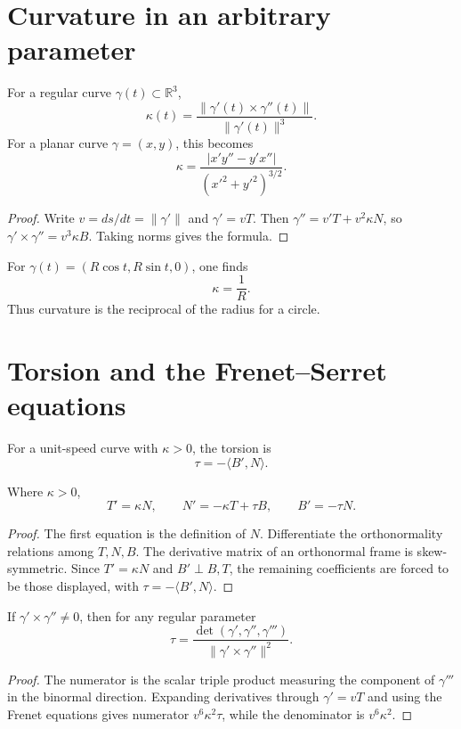 \section{Curvature in an arbitrary parameter}
\begin{theorem}\label{thm:vii13-curvature-formula}
For a regular curve \(\gamma(t)\subset\mathbb R^3\),
\[
\boxed{\kappa(t)=\frac{\|\gamma'(t)\times\gamma''(t)\|}{\|\gamma'(t)\|^3}.}
\]
For a planar curve \(\gamma=(x,y)\), this becomes
\[
\kappa=\frac{|x'y''-y'x''|}{(x'^2+y'^2)^{3/2}}.
\]
\end{theorem}
\begin{proof}
Write \(v=ds/dt=\|\gamma'\|\) and \(\gamma'=vT\).  Then \(\gamma''=v'T+v^2\kappa N\), so
\(\gamma'\times\gamma''=v^3\kappa B\).  Taking norms gives the formula.
\end{proof}

\begin{example}[Circle]\label{ex:vii13-circle}
For \(\gamma(t)=(R\cos t,R\sin t,0)\), one finds
\[
\kappa=\frac1R.
\]
Thus curvature is the reciprocal of the radius for a circle.
\end{example}

\section{Torsion and the Frenet--Serret equations}
\begin{definition}[Torsion]\label{def:vii13-torsion}
For a unit-speed curve with \(\kappa>0\), the torsion is
\[
\tau=-\langle B',N\rangle.
\]
\end{definition}

\begin{theorem}\label{thm:vii13-frenet-serret}
Where \(\kappa>0\),
\[
T'=\kappa N,\qquad
N'=-\kappa T+\tau B,\qquad
B'=-\tau N.
\]
\end{theorem}
\begin{proof}
The first equation is the definition of \(N\).  Differentiate the orthonormality relations among \(T,N,B\).  The derivative matrix of an orthonormal frame is skew-symmetric.  Since \(T'=\kappa N\) and \(B'\perp B,T\), the remaining coefficients are forced to be those displayed, with \(\tau=-\langle B',N\rangle\).
\end{proof}

\begin{theorem}\label{thm:vii13-torsion-formula}
If \(\gamma'\times\gamma''\neq0\), then for any regular parameter
\[
\boxed{\tau=
\frac{\det(\gamma',\gamma'',\gamma''')}{\|\gamma'\times\gamma''\|^2}.}
\]
\end{theorem}
\begin{proof}
The numerator is the scalar triple product measuring the component of \(\gamma'''\) in the binormal direction.  Expanding derivatives through \(\gamma'=vT\) and using the Frenet equations gives numerator \(v^6\kappa^2\tau\), while the denominator is \(v^6\kappa^2\).
\end{proof}

